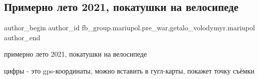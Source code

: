  
 
 
 
 

\subsection{Примерно лето 2021, покатушки на велосипеде}
\label{sec:12_03_2023.fb.fb_group.mariupol.pre_war.2.primerno_leto_2021__}
 
\ifcmt
 author_begin
   author_id fb_group.mariupol.pre_war,getalo_volodymyr.mariupol
 author_end
\fi

примерно лето 2021, покатушки на велосипеде

цифры - это gps-координаты, можно вставить в гугл-карты, покажет точку съёмки

